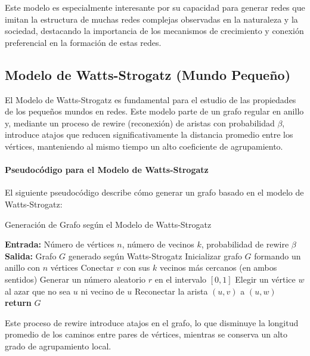 \documentclass[12pt]{book}
\begin{document}
Este modelo es especialmente interesante por su capacidad para generar redes que imitan la estructura de muchas redes complejas observadas en la naturaleza y la sociedad, destacando la importancia de los mecanismos de crecimiento y conexión preferencial en la formación de estas redes.
\subsection{Modelo de Watts-Strogatz (Mundo Pequeño)}

El Modelo de Watts-Strogatz es fundamental para el estudio de las propiedades de los pequeños mundos en redes. Este modelo parte de un grafo regular en anillo y, mediante un proceso de rewire (reconexión) de aristas con probabilidad $\beta$, introduce atajos que reducen significativamente la distancia promedio entre los vértices, manteniendo al mismo tiempo un alto coeficiente de agrupamiento.

\paragraph{Pseudocódigo para el Modelo de Watts-Strogatz}

El siguiente pseudocódigo describe cómo generar un grafo basado en el modelo de Watts-Strogatz:

\begin{algorithm}
\caption{Generación de Grafo según el Modelo de Watts-Strogatz}
\begin{algorithmic}[1]
\State \textbf{Entrada:} Número de vértices $n$, número de vecinos $k$, probabilidad de rewire $\beta$
\State \textbf{Salida:} Grafo $G$ generado según Watts-Strogatz
    \State Inicializar grafo $G$ formando un anillo con $n$ vértices
        \State Conectar $v$ con sus $k$ vecinos más cercanos (en ambos sentidos)
    \EndFor
        \State Generar un número aleatorio $r$ en el intervalo $[0, 1]$
            \State Elegir un vértice $w$ al azar que no sea $u$ ni vecino de $u$
            \State Reconectar la arista $(u, v)$ a $(u, w)$
        \EndIf
    \EndFor
    \State \textbf{return} $G$
\EndProcedure
\end{algorithmic}
\end{algorithm}

Este proceso de rewire introduce atajos en el grafo, lo que disminuye la longitud promedio de los caminos entre pares de vértices, mientras se conserva un alto grado de agrupamiento local.
\end{document}
